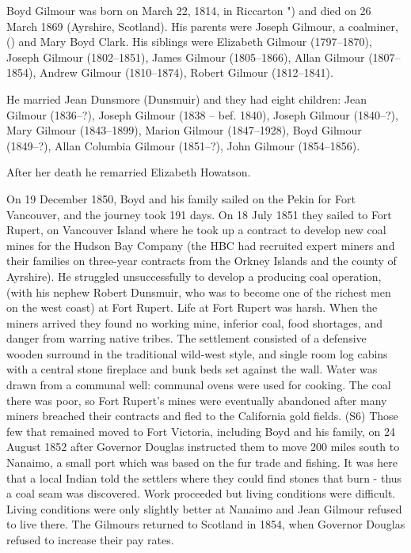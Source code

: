 
Boyd Gilmour was born on March 22, 1814, in Riccarton ") and died on 26 March 1869 (Ayrshire, Scotland).  His parents were Joseph Gilmour, a coalminer, () and Mary Boyd Clark. His siblings were Elizabeth Gilmour (1797--1870), Joseph Gilmour (1802--1851),
James Gilmour (1805--1866), Allan Gilmour (1807--1854), Andrew Gilmour (1810--1874), Robert Gilmour (1812--1841).


He married Jean Dunsmore (Dunsmuir) and they had eight children:  Jean Gilmour (1836--?), Joseph Gilmour (1838 -- bef. 1840), Joseph Gilmour (1840--?), Mary Gilmour (1843--1899),  Marion Gilmour (1847--1928), Boyd Gilmour (1849--?), Allan Columbia Gilmour (1851--?), John Gilmour (1854--1856).

After her death he remarried Elizabeth Howatson.

On 19 December 1850, Boyd and his family sailed on the Pekin for Fort Vancouver, and the journey took 191 days. On 18 July 1851 they sailed to Fort Rupert, on Vancouver Island where he took up a contract to develop new coal mines for the Hudson Bay Company (the HBC had recruited expert miners and their families on three-year contracts from the Orkney Islands and the county of Ayrshire). He struggled unsuccessfully to develop a producing coal operation, (with his nephew Robert Dunsmuir, who was to become one of the richest men on the west coast) at Fort Rupert. Life at Fort Rupert was harsh. When the miners arrived they found no working mine, inferior coal, food shortages, and danger from warring native tribes. The settlement consisted of a defensive wooden surround in the traditional wild-west style, and single room log cabins with a central stone fireplace and bunk beds set against the wall. Water was drawn from a communal well: communal ovens were used for cooking. The coal there was poor, so Fort Rupert’s mines were eventually abandoned after many miners breached their contracts and fled to the California gold fields. (S6) Those few that remained moved to Fort Victoria, including Boyd and his family, on 24 August 1852 after Governor Douglas instructed them to move 200 miles south to Nanaimo, a small port which was based on the fur trade and fishing. It was here that a local Indian told the settlers where they could find stones that burn - thus a coal seam was discovered. Work proceeded but living conditions were difficult. Living conditions were only slightly better at Nanaimo and Jean Gilmour refused to live there. The Gilmours returned to Scotland in 1854, when Governor Douglas refused to increase their pay rates.

